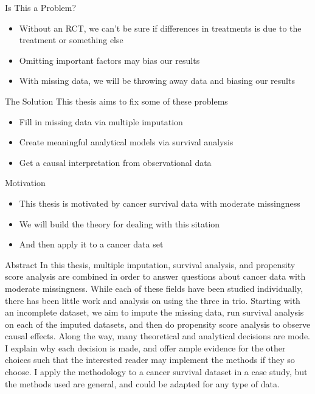 \begin{frame}{Is This a Problem?}

  \begin{itemize}
   \item Without an RCT, we can't be sure if differences in treatments is due to the treatment or something else
   \item Omitting important factors may bias our results
   \item With missing data, we will be throwing away data and biasing our results
  \end{itemize}


\end{frame}

\begin{frame}{The Solution}
This thesis aims to fix some of these problems
  \begin{itemize}
   \item Fill in missing data via multiple imputation
   \item Create meaningful analytical models via survival analysis
   \item Get a causal interpretation from observational data
  \end{itemize}


\end{frame}

\begin{frame}{Motivation}
\begin{itemize}
   \item This thesis is motivated by cancer survival data with moderate missingness
   \item We will build the theory for dealing with this sitation
   \item And then apply it to a cancer data set
  \end{itemize}


\end{frame}

\begin{frame}{Abstract}
In this thesis, multiple imputation, survival analysis, and propensity score analysis are combined in 
order to answer questions about cancer data with moderate missingness. While each of these fields have 
been studied individually, there has been little work and analysis on using the three in trio.
Starting with an incomplete dataset, we aim to impute the missing data, run survival analysis on each
of the imputed datasets, and then do propensity score analysis to observe causal effects.
Along the way, many theoretical and analytical decisions are mode. I explain why each decision is made, 
and offer ample evidence for the other choices such that the interested reader may implement the methods
if they so choose. I apply the methodology to a cancer survival dataset in a case study, but the methods 
used are general, and could be adapted for any type of data.
 
\end{frame}
